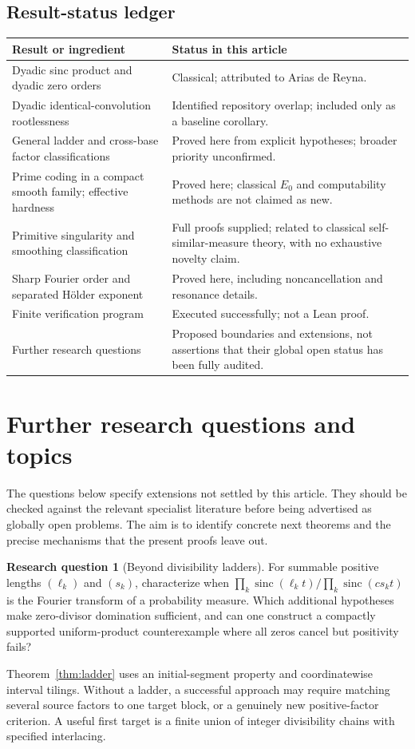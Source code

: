 \documentclass[11pt,a4paper]{article}
\theoremstyle{definition}
\newtheorem{question}{Research question}
\theoremstyle{remark}
\newcommand{\sinc}{\operatorname{sinc}}
\begin{document}
\subsection{Result-status ledger}
\begin{center}
\begin{tabular}{@{}>{\raggedright\arraybackslash}p{5.2cm}>{\raggedright\arraybackslash}p{7.6cm}@{}}
\toprule
Result or ingredient & Status in this article\\
\midrule
Dyadic sinc product and dyadic zero orders & Classical; attributed to
Arias de Reyna.\\
Dyadic identical-convolution rootlessness & Identified repository overlap;
included only as a baseline corollary.\\
General ladder and cross-base factor classifications & Proved here from
explicit hypotheses; broader priority unconfirmed.\\
Prime coding in a compact smooth family; effective hardness & Proved here;
classical $E_0$ and computability methods are not claimed as new.\\
Primitive singularity and smoothing classification & Full proofs supplied;
related to classical self-similar-measure theory, with no exhaustive novelty
claim.\\
Sharp Fourier order and separated H\"older exponent & Proved here, including
noncancellation and resonance details.\\
Finite verification program & Executed successfully; not a Lean proof.\\
Further research questions & Proposed boundaries and extensions, not
assertions that their global open status has been fully audited.\\
\bottomrule
\end{tabular}
\end{center}

\section{Further research questions and topics}
\label{sec:questions}
The questions below specify extensions not settled by this article.
They should be checked against the relevant specialist literature before
being advertised as globally open problems. The aim is to identify concrete
next theorems and the precise mechanisms that the present proofs leave out.

\begin{question}[Beyond divisibility ladders]
For summable positive lengths $(\ell_k)$ and $(s_k)$, characterize when
$\prod_k\sinc(\ell_kt)/\prod_k\sinc(cs_kt)$ is the Fourier transform of a
probability measure. Which additional hypotheses make zero-divisor
domination sufficient, and can one construct a compactly supported
uniform-product counterexample where all zeros cancel but positivity fails?
\end{question}
Theorem~\ref{thm:ladder} uses an initial-segment property and coordinatewise
interval tilings. Without a ladder, a successful approach may require
matching several source factors to one target block, or a genuinely new
positive-factor criterion. A useful first target is a finite union of
integer divisibility chains with specified interlacing.
\end{document}
